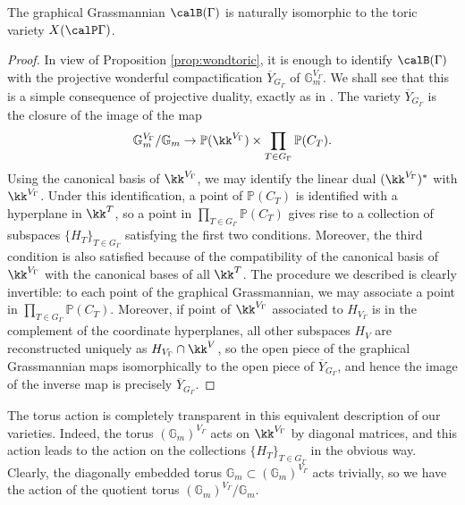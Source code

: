 \begin{prop}
The graphical Grassmannian $\calB(\Gamma)$ is naturally isomorphic to the toric variety $X(\calP\Gamma)$. 
\end{prop}

\begin{proof}
In view of Proposition \ref{prop:wondtoric}, it is enough to identify $\calB(\Gamma)$ with the projective wonderful compactification $\overline{Y}_{G_\Gamma}$ of $\mathbb{G}_m^{V_\Gamma}$. We shall see that this is a simple consequence of projective duality, exactly as in \cite[Th.~5.2.1]{MR4072173}. The variety $\overline{Y}_{G_\Gamma}$ is the closure of the image of the map
 \[
\mathbb{G}_m^{V_\Gamma}/\mathbb{G}_m\to\mathbb{P}(\kk^{V_\Gamma})\times\prod_{T\in G_\Gamma} \mathbb{P}(C_T).
 \]
Using the canonical basis of $\kk^{V_\Gamma}$, we may identify the linear dual $(\kk^{V_\Gamma})^*$ with $\kk^{V_\Gamma}$. Under this identification, a point of $\mathbb{P}(C_T)$ is identified with a hyperplane in $\kk^{T}$, so a point in $\prod_{T\in G_\Gamma} \mathbb{P}(C_T)$ gives rise to a collection of subspaces $\{H_T\}_{T\in G_\Gamma}$ satisfying the first two conditions. Moreover, the third condition is also satisfied because of the compatibility of the canonical basis of $\kk^{V_\Gamma}$ with the canonical bases of all $\kk^T$. The procedure we described is clearly invertible: to each point of the graphical Grassmannian, we may associate a point in $\prod_{T\in G_\Gamma} \mathbb{P}(C_T)$. Moreover, if point of $\kk^{V_\Gamma}$ associated to $H_{V_\Gamma}$ is in the complement of the coordinate hyperplanes, all other subspaces $H_V$ are reconstructed uniquely as $H_{V_\Gamma}\cap\kk^{V}$, so the open piece of the graphical Grassmannian maps isomorphically to the open piece of $\overline{Y}_{G_\Gamma}$, and hence the image of the inverse map is precisely $\overline{Y}_{G_\Gamma}$.
\end{proof}

The torus action is completely transparent in this equivalent description of our varieties. Indeed, the torus $(\mathbb{G}_m)^{V_\Gamma}$ acts on $\kk^{V_\Gamma}$ by diagonal matrices, and this action leads to the action on the collections $\{H_T\}_{T\in G_\Gamma}$ in the obvious way. Clearly, the diagonally embedded torus $\mathbb{G}_m\subset (\mathbb{G}_m)^{V_\Gamma}$ acts trivially, so we have the action of the quotient torus $(\mathbb{G}_m)^{V_\Gamma}/\mathbb{G}_m$. 

